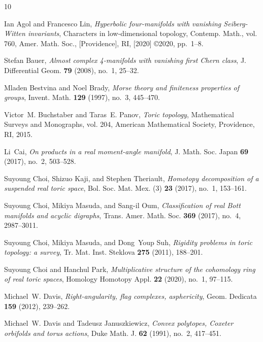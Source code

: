 \documentclass{amsart}
\numberwithin{equation}{section}
\theoremstyle{definition}
\theoremstyle{remark}
\begin{document}
\begin{thebibliography}{10}

Ian Agol and Francesco Lin, \emph{Hyperbolic four-manifolds with vanishing
  {S}eiberg-{W}itten invariants}, Characters in low-dimensional topology,
  Contemp. Math., vol. 760, Amer. Math. Soc., [Providence], RI, [2020]
  \copyright 2020, pp.~1--8. 

Stefan Bauer, \emph{Almost complex 4-manifolds with vanishing first {C}hern
  class}, J. Differential Geom. \textbf{79} (2008), no.~1, 25--32. 

Mladen Bestvina and Noel Brady, \emph{Morse theory and finiteness properties of
  groups}, Invent. Math. \textbf{129} (1997), no.~3, 445--470. 

Victor~M. Buchstaber and Taras~E. Panov, \emph{Toric topology}, Mathematical
  Surveys and Monographs, vol. 204, American Mathematical Society, Providence,
  RI, 2015. 

Li~Cai, \emph{On products in a real moment-angle manifold}, J. Math. Soc. Japan
  \textbf{69} (2017), no.~2, 503--528. 

Suyoung Choi, Shizuo Kaji, and Stephen Theriault, \emph{Homotopy decomposition
  of a suspended real toric space}, Bol. Soc. Mat. Mex. (3) \textbf{23} (2017),
  no.~1, 153--161. 

Suyoung Choi, Mikiya Masuda, and Sang-il Oum, \emph{Classification of real
  {B}ott manifolds and acyclic digraphs}, Trans. Amer. Math. Soc. \textbf{369}
  (2017), no.~4, 2987--3011. 

Suyoung Choi, Mikiya Masuda, and Dong~Youp Suh, \emph{Rigidity problems in
  toric topology: a survey}, Tr. Mat. Inst. Steklova \textbf{275} (2011),
  188--201. 

Suyoung Choi and Hanchul Park, \emph{Multiplicative structure of the cohomology
  ring of real toric spaces}, Homology Homotopy Appl. \textbf{22} (2020),
  no.~1, 97--115. 

Michael~W. Davis, \emph{Right-angularity, flag complexes, asphericity}, Geom.
  Dedicata \textbf{159} (2012), 239--262. 

Michael~W. Davis and Tadeusz Januszkiewicz, \emph{Convex polytopes, {C}oxeter
  orbifolds and torus actions}, Duke Math. J. \textbf{62} (1991), no.~2,
  417--451. 


\end{thebibliography}
\end{document}
